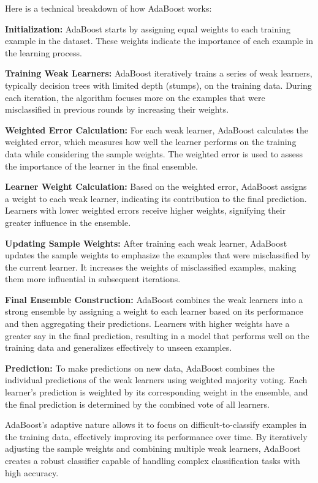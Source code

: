 \documentclass[preprint,aps,nofootinbib,a4paper,superscriptaddress,longbibliography,amsfonts,amssymb,amsmath,titlepage]{revtex4-2}
\begin{document}
Here is a technical breakdown of how AdaBoost works:

\textbf{Initialization:} AdaBoost starts by assigning equal weights to each training example in the dataset. These weights indicate the importance of each example in the learning process.

\textbf{Training Weak Learners:} AdaBoost iteratively trains a series of weak learners, typically decision trees with limited depth (stumps), on the training data. During each iteration, the algorithm focuses more on the examples that were misclassified in previous rounds by increasing their weights.

\textbf{Weighted Error Calculation:} For each weak learner, AdaBoost calculates the weighted error, which measures how well the learner performs on the training data while considering the sample weights. The weighted error is used to assess the importance of the learner in the final ensemble.

\textbf{Learner Weight Calculation:} Based on the weighted error, AdaBoost assigns a weight to each weak learner, indicating its contribution to the final prediction. Learners with lower weighted errors receive higher weights, signifying their greater influence in the ensemble.

\textbf{Updating Sample Weights:} After training each weak learner, AdaBoost updates the sample weights to emphasize the examples that were misclassified by the current learner. It increases the weights of misclassified examples, making them more influential in subsequent iterations.

\textbf{Final Ensemble Construction:} AdaBoost combines the weak learners into a strong ensemble by assigning a weight to each learner based on its performance and then aggregating their predictions. Learners with higher weights have a greater say in the final prediction, resulting in a model that performs well on the training data and generalizes effectively to unseen examples.

\textbf{Prediction:} To make predictions on new data, AdaBoost combines the individual predictions of the weak learners using weighted majority voting. Each learner's prediction is weighted by its corresponding weight in the ensemble, and the final prediction is determined by the combined vote of all learners.

AdaBoost's adaptive nature allows it to focus on difficult-to-classify examples in the training data, effectively improving its performance over time. By iteratively adjusting the sample weights and combining multiple weak learners, AdaBoost creates a robust classifier capable of handling complex classification tasks with high accuracy.
\end{document}
